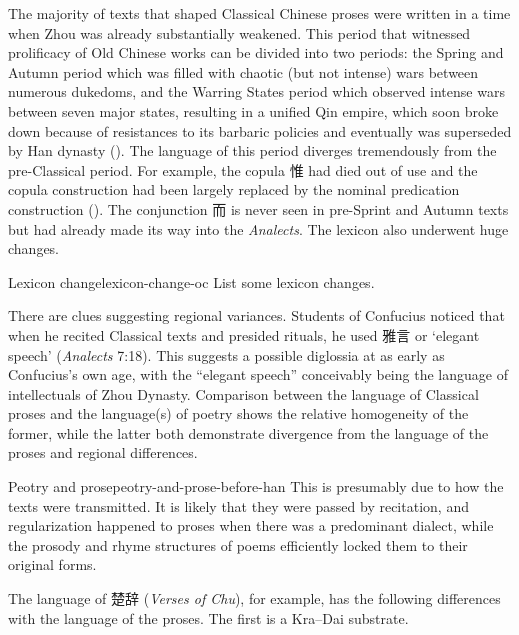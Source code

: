 \documentclass[UTF8, a4paper, oneside, scheme=plain, 12pt]{ctexrep}
\newcommand{\work}[1]{\textit{#1}}
\newcommand{\translate}[1]{`#1'}
\begin{document}
The majority of texts that shaped Classical Chinese proses
were written in a time when Zhou was already substantially weakened.
This period that witnessed prolificacy of Old Chinese works
can be divided into two periods:
the Spring and Autumn period which was filled with chaotic (but not intense) wars between numerous dukedoms,
and the Warring States period which observed intense wars between seven major states,
resulting in a unified Qin empire,
which soon broke down because of resistances to its barbaric policies 
and eventually was superseded by Han dynasty ().
The language of this period diverges tremendously from the pre-Classical period.
For example, the copula 惟 had died out of use 
and the copula construction had been largely replaced by the nominal predication construction
().
The conjunction 而 is never seen in pre-Sprint and Autumn texts
but had already made its way into the \work{Analects}.
The lexicon also underwent huge changes.

\begin{todobox}{Lexicon change}{lexicon-change-oc}
    List some lexicon changes.
\end{todobox}

There are clues suggesting regional variances.
Students of Confucius noticed that when he recited Classical texts and presided rituals,
he used 雅言 or \translate{elegant speech} (\work{Analects} 7:18).
This suggests a possible diglossia at as early as Confucius's own age,
with the ``elegant speech'' conceivably being the language of intellectuals of Zhou Dynasty.
Comparison between the language of Classical proses and the language(s) of poetry
shows the relative homogeneity of the former,
while the latter both demonstrate divergence from the language of the proses
and regional differences.

\begin{todobox}{Peotry and prose}{peotry-and-prose-before-han}
    This is presumably due to how the texts were transmitted.
    It is likely that they were passed by recitation,
    and regularization happened to proses when there was a predominant dialect,
    while the prosody and rhyme structures of poems
    efficiently locked them to their original forms.
\end{todobox}

The language of 楚辞 (\work{Verses of Chu}), for example,
has the following differences with the language of the proses. 
The first is a Kra–Dai substrate.
\end{document}

